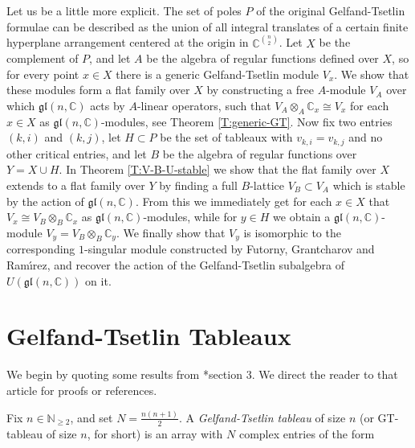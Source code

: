 \documentclass[11pt,fleqn]{article}
\newcommand\NN{\mathbb N}
\newcommand\CC{\mathbb C}
\newcommand\ot{\otimes}
\newcommand\gl{\mathfrak{gl}}
\begin{document}
Let us be a little more explicit. The set of poles $P$ of the original 
Gelfand-Tsetlin formulae can be described as the union of all integral 
translates of a certain finite hyperplane arrangement centered at the origin 
in $\CC^{\binom{n}{2}}$. Let $X$ be the complement of $P$, and let $A$ be the 
algebra of regular functions defined over $X$, so for every point $x \in X$
there is a generic Gelfand-Tsetlin module $V_x$. We show that these modules
form a flat family over $X$ by constructing a free $A$-module $V_A$ over which 
$\gl(n, \CC)$ acts by $A$-linear operators, such that $V_A \ot_A \CC_x \cong 
V_x$ for each $x \in X$ as $\gl(n,\CC)$-modules, see Theorem 
\ref{T:generic-GT}. Now fix two entries $(k,i)$ and $(k,j)$, let $H \subset P$ 
be the set of tableaux with $v_{k,i} = v_{k,j}$ and no other critical entries,
and let $B$ be the algebra of regular functions over $Y = X \cup H$. In 
Theorem \ref{T:V-B-U-stable} we show that the flat family over $X$ extends 
to a flat family over $Y$ by finding a full $B$-lattice $V_B \subset V_A$
which is stable by the action of $\gl(n,\CC)$. From this we immediately get 
for each $x \in X$ that $V_x \cong V_B \ot_B \CC_x$ as $\gl(n,\CC)$-modules, 
while for $y \in H$ we obtain a $\gl(n,\CC)$-module $V_y = V_B \ot_B \CC_y$. 
We finally show that $V_y$ is isomorphic to the corresponding $1$-singular 
module constructed by Futorny, Grantcharov and Ram\'\i rez, and recover the
action of the Gelfand-Tsetlin subalgebra of $U(\gl(n,\CC))$ on it. 

\section{Gelfand-Tsetlin Tableaux}
We begin by quoting some results from \cite{FGR-singular-gt}*{section 3}. We 
direct the reader to that article for proofs or references.

Fix $n \in \NN_{\geq 2}$, and set $N = \frac{n(n+1)}{2}$. A 
\emph{Gelfand-Tsetlin tableau} of size $n$ (or GT-tableau of size $n$, for 
short) is an array with $N$ complex entries of the form

\end{document}
